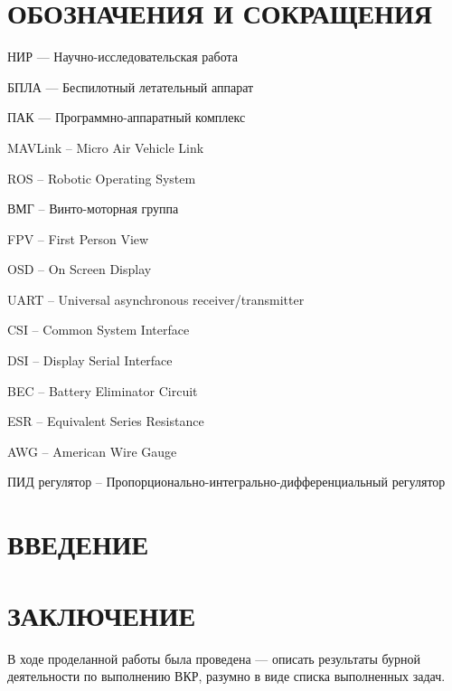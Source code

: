 \documentclass[a4paper,12pt]{article}
\begin{document}
\section*{\centering ОБОЗНАЧЕНИЯ И СОКРАЩЕНИЯ}

НИР --- Научно-исследовательская работа

БПЛА --- Беспилотный летательный аппарат

ПАК --- Программно-аппаратный комплекс

MAVLink -- Micro Air Vehicle Link

ROS -- Robotic Operating System

ВМГ -- Винто-моторная группа

FPV -- First Person View

OSD -- On Screen Display

UART -- Universal asynchronous receiver/transmitter

CSI -- Common System Interface

DSI -- Display Serial Interface

BEC -- Battery Eliminator Circuit

ESR -- Equivalent Series Resistance

AWG -- American Wire Gauge

ПИД регулятор -- Пропорционально-интегрально-дифференциальный регулятор

\pagebreak
{}
\tableofcontents

\thispagestyle{empty} %
\pagebreak

\setcounter{page}{3}
\section*{\centering ВВЕДЕНИЕ}
\pagebreak
\pagebreak
\pagebreak
\pagebreak
\pagebreak
\pagebreak

\section*{\centering ЗАКЛЮЧЕНИЕ}

В ходе проделанной работы была проведена --- описать результаты бурной деятельности по выполнению ВКР, разумно в виде списка выполненных задач.
\end{document}
